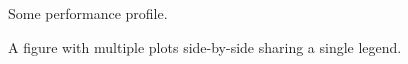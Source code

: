 \documentclass{article}
\begin{document}
\lipsum[1-2]

\begin{figure}[t]
    \centering
    
    \caption{Some performance profile.}
    \label{fig:some_performance_profile}
\end{figure}

\lipsum[2-3]

\begin{figure}[t]
    \centering
    
    
    \caption{A figure with multiple plots side-by-side sharing a single legend.}
    \label{fig:combined}
\end{figure}
\end{document}
